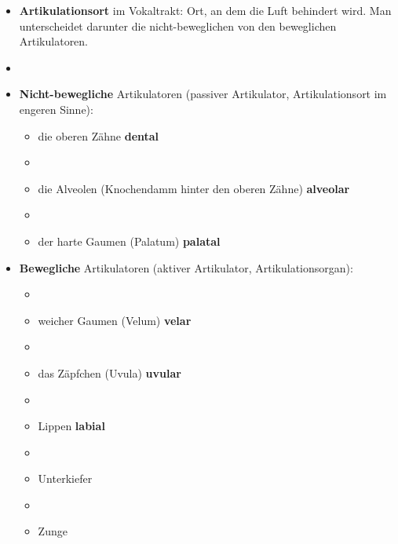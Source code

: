 \begin{frame}

	\begin{itemize}
		\item \textbf{Artikulationsort} im Vokaltrakt: Ort, an dem die Luft behindert wird. Man unterscheidet darunter die nicht-beweglichen von den beweglichen Artikulatoren.

		\item[]
		\item \textbf{Nicht-bewegliche} Artikulatoren (passiver Artikulator, Artikulationsort im engeren Sinne):
			
		\begin{itemize}
			\item die oberen Zähne \ras \textbf{dental}
			\item[]
			\item die Alveolen (Knochendamm hinter den oberen Zähne) \ras \textbf{alveolar}
			\item[]
			\item der harte Gaumen (Palatum) \ras \textbf{palatal}
		\end{itemize}
		
	\end{itemize}
	
\end{frame}



\begin{frame}

\begin{itemize}
	\item \textbf{Bewegliche} Artikulatoren (aktiver Artikulator, Artikulationsorgan):
			
	\begin{itemize}
		\item[]
		\item weicher Gaumen (Velum) \ras \textbf{velar}
		\item[]
		\item das Zäpfchen (Uvula) \ras \textbf{uvular}
		\item[]
		\item Lippen \ras \textbf{labial}
		\item[]
		\item Unterkiefer
		\item[]
		\item Zunge
	\end{itemize}

\end{itemize}

\end{frame}


